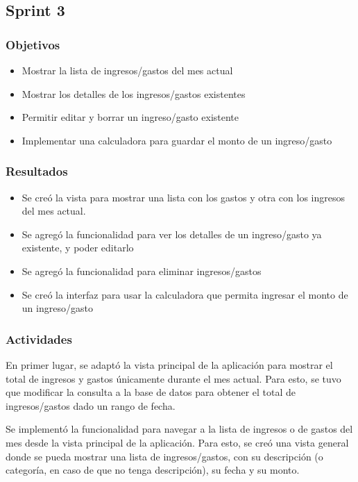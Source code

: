 \subsection{Sprint 3}
\subsubsection{Objetivos}
\begin{itemize}
\item Mostrar la lista de ingresos/gastos del mes actual
\item Mostrar los detalles de los ingresos/gastos existentes
\item Permitir editar y borrar un ingreso/gasto existente
\item Implementar una calculadora para guardar el monto de un ingreso/gasto
\end{itemize}

\subsubsection{Resultados}
\begin{itemize}
\item Se creó la vista para mostrar una lista con los gastos y otra con los ingresos del mes actual.
\item Se agregó la funcionalidad para ver los detalles de un ingreso/gasto ya existente, y poder editarlo
\item Se agregó la funcionalidad para eliminar ingresos/gastos
\item Se creó la interfaz para usar la calculadora que permita ingresar el monto de un ingreso/gasto
\end{itemize}

\subsubsection{Actividades}
En primer lugar, se adaptó la vista principal de la aplicación para mostrar el total de ingresos y gastos únicamente durante el mes actual. Para esto, se tuvo que modificar la consulta a la base de datos para obtener el total de ingresos/gastos dado un rango de fecha.

Se implementó la funcionalidad para navegar a la lista de ingresos o de gastos del mes desde la vista principal de la aplicación. Para esto, se creó una vista general donde se pueda mostrar una lista de ingresos/gastos, con su descripción (o categoría, en caso de que no tenga descripción), su fecha y su monto.

